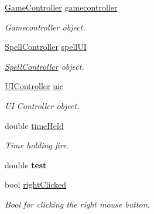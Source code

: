 \begin{DoxyCompactItemize}
\mbox{\label{class_player_ae0baab096eb0714ffa516b6a1de9eed6}} 
\hyperlink{class_game_controller}{Game\+Controller} \hyperlink{class_player_ae0baab096eb0714ffa516b6a1de9eed6}{gamecontroller}
\begin{DoxyCompactList}\small\item\em Gamecontroller object. \end{DoxyCompactList}\item 
\mbox{\label{class_player_aa05f0fb4e449ec97d7bf20fd90aa1967}} 
\hyperlink{class_spell_controller}{Spell\+Controller} \hyperlink{class_player_aa05f0fb4e449ec97d7bf20fd90aa1967}{spell\+UI}
\begin{DoxyCompactList}\small\item\em \hyperlink{class_spell_controller}{Spell\+Controller} object. \end{DoxyCompactList}\item 
\mbox{\label{class_player_afb08071e4a3f39dc03d0f36fad786dab}} 
\hyperlink{class_u_i_controller}{U\+I\+Controller} \hyperlink{class_player_afb08071e4a3f39dc03d0f36fad786dab}{uic}
\begin{DoxyCompactList}\small\item\em UI Controller object. \end{DoxyCompactList}\item 
\mbox{\label{class_player_ad5c386687ea25d8dc7ed86fdd0850608}} 
double \hyperlink{class_player_ad5c386687ea25d8dc7ed86fdd0850608}{time\+Held}
\begin{DoxyCompactList}\small\item\em Time holding fire. \end{DoxyCompactList}\item 
\mbox{\label{class_player_a97f79d09dde65f96851c5b92d5db79b7}} 
double {\bfseries test}
\item 
\mbox{\label{class_player_ad694265b88e8ce48081e240b9ec915f2}} 
bool \hyperlink{class_player_ad694265b88e8ce48081e240b9ec915f2}{right\+Clicked}
\begin{DoxyCompactList}\small\item\em Bool for clicking the right mouse button. \end{DoxyCompactList}\item 

\end{DoxyCompactItemize}
